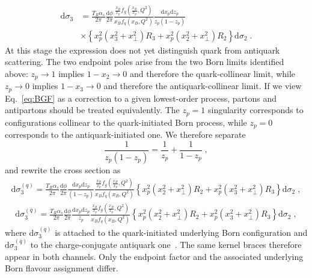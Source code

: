 \documentclass[a4paper,11pt]{article}
\begin{document}
\begin{align}\label{eq:BGF}
  \mathrm{d}\sigma_3 &= \frac{T_R\alpha_s}{2\pi}\frac{\mathrm{d}\phi}{2\pi}
    \frac{\frac{x_B}{x_p} f_g\!\left(\frac{x_B}{x_p},Q^2\right)}{ x_B f_q\!\left( x_B ,Q^2\right)}
    \frac{\mathrm{d} x_p \mathrm{d}z_p}{z_p(1-z_p)} \\\nonumber
    & \times \left\{ x_p^2 ( x_3^2 + x_\perp^2 ) R_3 +
        x_p^2 (x_2^2 + x_\perp^2) R_2 \right\} \mathrm{d} \sigma_2\;.
\end{align}
At this stage the expression does not yet distinguish quark from antiquark scattering. The two endpoint poles arise from the two Born limits identified above: $z_p\to1$ implies $1-x_2\to0$ and therefore the quark-collinear limit, while $z_p\to0$ implies $1-x_3\to0$ and therefore the antiquark-collinear limit. If we view Eq.~\eqref{eq:BGF} as a correction to a given lowest-order process, partons and antipartons should be treated equivalently. The $z_p = 1$ singularity corresponds to configurations collinear to the quark-initiated Born process, while $z_p = 0$ corresponds to the antiquark-initiated one. We therefore separate
\begin{equation}
\frac{1}{z_{p}(1-z_{p})}=\frac{1}{z_{p}}+\frac{1}{1-z_{p}}\;,
\label{eq:zp-partfrac}
\end{equation}
and rewrite the cross section as
\begin{align}
\mathrm{d}\sigma_3^{(q)} = \frac{T_R\alpha_s}{2\pi}\frac{\mathrm{d}\phi}{2\pi}
\frac{\mathrm{d}x_p\mathrm{d}z_p}{(1-z_p)} \frac{\frac{x_B}{x_p}f_g(\frac{x_B}{x_p}, Q^2)}{x_Bf_q(x_B, Q^2)}
\left\{x_p^2(x_2^2+x_\perp^2)R_2+x_p^2(x_3^2+x_\perp^2)R_3\right\}\mathrm{d} \sigma_2\;,
\end{align}
\begin{align}
\mathrm{d}\sigma_3^{(\bar q)} = \frac{T_R\alpha_s}{2\pi}\frac{\mathrm{d}\phi}{2\pi}
\frac{\mathrm{d}x_p\mathrm{d}z_p}{z_p} \frac{\frac{x_B}{x_p}f_g(\frac{x_B}{x_p}, Q^2)}{x_Bf_q(x_B, Q^2)}
\left\{x_p^2(x_2^2+x_\perp^2)R_2+x_p^2(x_3^2+x_\perp^2)R_3\right\}\mathrm{d} \sigma_2\;,
\end{align}
where $\mathrm{d}\sigma_3^{(q)}$ is attached to the quark-initiated underlying Born configuration and $\mathrm{d}\sigma_3^{(\bar q)}$ to the charge-conjugate antiquark one~\cite{Seymour:1994we,Seymour:1994ti}. The same kernel braces therefore appear in both channels. Only the endpoint factor and the associated underlying Born flavour assignment differ.
\end{document}
